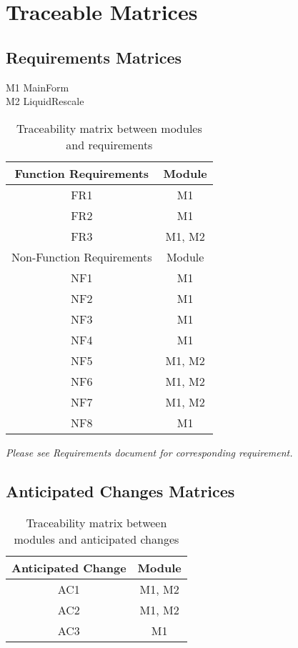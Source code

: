 \documentclass{article}
\begin{document}
\section{Traceable Matrices}
\subsection{Requirements Matrices}
M1 \rightarrow MainForm \\
M2 \rightarrow LiquidRescale

\begin{table}[h!]
    \centering
    \caption{Traceability matrix between modules and requirements}
    \begin{tabular}{| c | c |}
        \hline Function Requirements & Module \\ 
        \hline FR1 & M1 \\  
        \hline FR2 & M1 \\
        \hline FR3 & M1, M2 \\
        \hline
        \hline
        \hline Non-Function Requirements & Module \\
        \hline NF1 & M1 \\  
        \hline NF2 & M1 \\
        \hline NF3 & M1 \\
        \hline NF4 & M1 \\
        \hline NF5 & M1, M2 \\
        \hline NF6 & M1, M2 \\
        \hline NF7 & M1, M2 \\
        \hline NF8 & M1 \\
        \hline
    \end{tabular}
\end{table}

\begin{center}
    \emph{Please see Requirements document for corresponding requirement.}
\end{center}

\subsection{Anticipated Changes Matrices}
\begin{table}[h!]
    \centering
    \caption{Traceability matrix between modules and anticipated changes}
    \begin{tabular}{| c | c |}
        \hline Anticipated Change & Module \\
        \hline AC1 & M1, M2 \\  
        \hline AC2 & M1, M2 \\
        \hline AC3 & M1 \\
        \hline
    \end{tabular}
\end{table}
\end{document}
